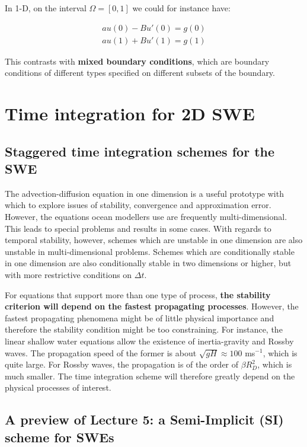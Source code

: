 In 1-D, on the interval $\Omega=[0,1]$ we could for instance have:

\begin{eqnarray}
	au(0)-Bu'(0)=g(0) \\
	au(1)+Bu'(1)=g(1) \nonumber
\end{eqnarray}

This contrasts with \textbf{mixed boundary conditions}, which are boundary conditions of different types specified on different subsets of the boundary.

\clearpage

\section{Time integration for 2D SWE}
\subsection{Staggered time integration schemes for the SWE}

The advection-diffusion equation in one dimension is a useful prototype with which to explore issues of stability, convergence and approximation error. However, the equations ocean modellers use are frequently multi-dimensional. This leads to special problems and results in some cases. With regards to temporal stability, however, schemes which are unstable in one dimension are also unstable in multi-dimensional problems. Schemes which are conditionally stable in one dimension are also conditionally stable in two dimensions or higher, but with more restrictive conditions on $\Delta t$.

\vspace{0.2cm}For equations that support more than one type of process, {\bf the stability criterion will depend on the fastest propagating processes}. However, the fastest propagating phenomena might be of little physical importance and therefore the stability condition might be too constraining. For instance, the linear shallow water equations allow the existence of inertia-gravity and Rossby waves. The propagation speed of the former is about $\sqrt{gH} \approx 100 $ ms$^{-1}$, which is quite large. For Rossby waves, the propagation is of the order of $\beta R_D^2$, which is much smaller. The time integration scheme will therefore greatly depend on the physical processes of interest. 

\subsection{A preview of Lecture 5: a Semi-Implicit (SI) scheme for SWEs}

